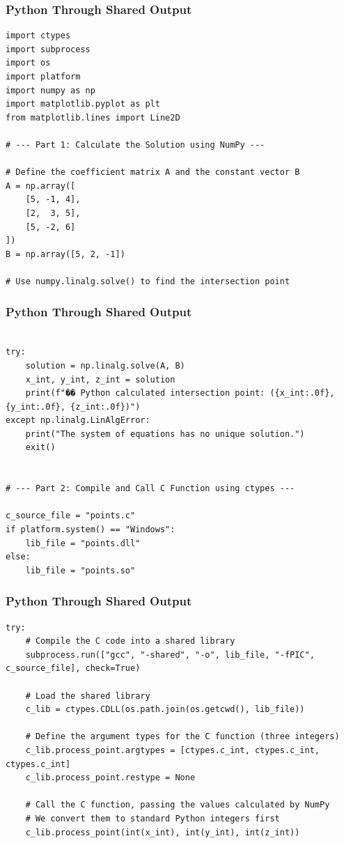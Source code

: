 \documentclass{beamer}
\begin{document}
\begin{frame}[fragile]
\frametitle{Python Through Shared Output}
\begin{lstlisting} 
import ctypes
import subprocess
import os
import platform
import numpy as np
import matplotlib.pyplot as plt
from matplotlib.lines import Line2D

# --- Part 1: Calculate the Solution using NumPy ---

# Define the coefficient matrix A and the constant vector B
A = np.array([
    [5, -1, 4],
    [2,  3, 5],
    [5, -2, 6]
])
B = np.array([5, 2, -1])

# Use numpy.linalg.solve() to find the intersection point
\end{lstlisting}
\end{frame}
\begin{frame}[fragile]
\frametitle{Python Through Shared Output}
\begin{lstlisting} 

try:
    solution = np.linalg.solve(A, B)
    x_int, y_int, z_int = solution
    print(f"�� Python calculated intersection point: ({x_int:.0f}, {y_int:.0f}, {z_int:.0f})")
except np.linalg.LinAlgError:
    print("The system of equations has no unique solution.")
    exit()


# --- Part 2: Compile and Call C Function using ctypes ---

c_source_file = "points.c"
if platform.system() == "Windows":
    lib_file = "points.dll"
else:
    lib_file = "points.so"
\end{lstlisting}
\end{frame}
\begin{frame}[fragile]
\frametitle{Python Through Shared Output}
\begin{lstlisting} 
try:
    # Compile the C code into a shared library
    subprocess.run(["gcc", "-shared", "-o", lib_file, "-fPIC", c_source_file], check=True)
    
    # Load the shared library
    c_lib = ctypes.CDLL(os.path.join(os.getcwd(), lib_file))

    # Define the argument types for the C function (three integers)
    c_lib.process_point.argtypes = [ctypes.c_int, ctypes.c_int, ctypes.c_int]
    c_lib.process_point.restype = None

    # Call the C function, passing the values calculated by NumPy
    # We convert them to standard Python integers first
    c_lib.process_point(int(x_int), int(y_int), int(z_int))
\end{lstlisting}
\end{frame}
\end{document}
